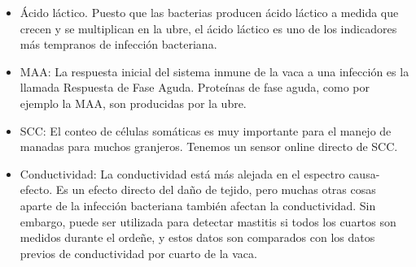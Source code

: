 \documentclass[a4paper, 11pt]{article}
\begin{document}
\begin{itemize}
	\item Ácido láctico. Puesto que las bacterias producen ácido láctico a medida que crecen y se multiplican en la ubre, el ácido láctico es uno de los indicadores más tempranos de infección bacteriana.
	\item MAA: La respuesta	inicial del sistema inmune de la vaca a una infección es la llamada Respuesta de Fase Aguda. Proteínas de fase aguda, como por ejemplo la MAA, son producidas por la ubre.
	\item SCC: El conteo de células somáticas es muy importante para el manejo de manadas para muchos granjeros. Tenemos un sensor online directo de SCC.
	\item Conductividad: La conductividad está más alejada en el espectro causa-efecto. Es un efecto directo del daño de tejido, pero muchas otras cosas aparte de la infección bacteriana también afectan la conductividad. Sin embargo, puede ser utilizada para detectar mastitis si todos los cuartos son medidos durante el ordeñe, y estos datos son comparados con los datos previos de conductividad por cuarto de la vaca.
\end{itemize}

%
\end{document}
